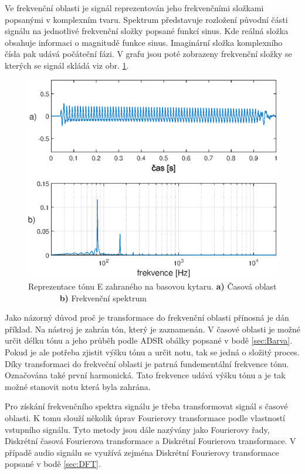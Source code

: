   Ve frekvenční oblasti je signál reprezentován jeho frekvenčními složkami popsanými v komplexním tvaru.
  Spektrum představuje rozložení původní části signálu na jednotlivé frekvenční složky popsané funkcí sinus. Kde reálná složka obsahuje informaci o magnitudě  funkce sinus.
  Imaginární složka komplexního čísla pak udává počáteční fázi.
  V grafu jsou poté zobrazeny frekvenční složky se kterých se signál skládá viz obr. \ref{fig:Bass_tone}.

  \begin{figure}[H]
    \centering
        \includegraphics[width = 0.8\linewidth]{obrazky/Bass_tone_spectrum.eps}
    \caption{Reprezentace tónu E zahraného na basovou kytaru. \textbf{a)} Časová oblast ~ ~ ~ ~ ~\textbf{b)} Frekvenční spektrum}
    \label{fig:Bass_tone}
\end{figure}
  
  Jako názorný důvod proč je transformace do frekvenční oblasti přínosná je dán příklad. Na nástroj je zahrán tón, který je zaznamenán. 
  V časové oblasti je možné určit délku tónu a jeho průběh podle ADSR obálky popsané v bodě \ref{sec:Barva}.
  Pokud je ale potřeba zjistit výšku tónu a určit notu, tak se jedná o složitý proces.
  Díky transformaci do frekveční oblasti je patrná fundementální frekvence tónu.
  Označována také první harmonická.
  Tato frekvence udává výšku tónu a je tak možné stanovit notu která byla zahrána.

  Pro získání frekvenčního spektra signálu je třeba transformovat signál s časové oblasti. K tomu slouží několik úprav Fourierovy transformace podle vlastností vstupního signálu. Tyto metody jsou dále nazývány jako Fourierovy řady, Diskrétní časová Fourierova transformace a Diskrétní Fourierova transformace. V případě audio signálu se využívá zejména Diskrétní Fourierovy transformace popsané v bodě \ref{sec:DFT}.

